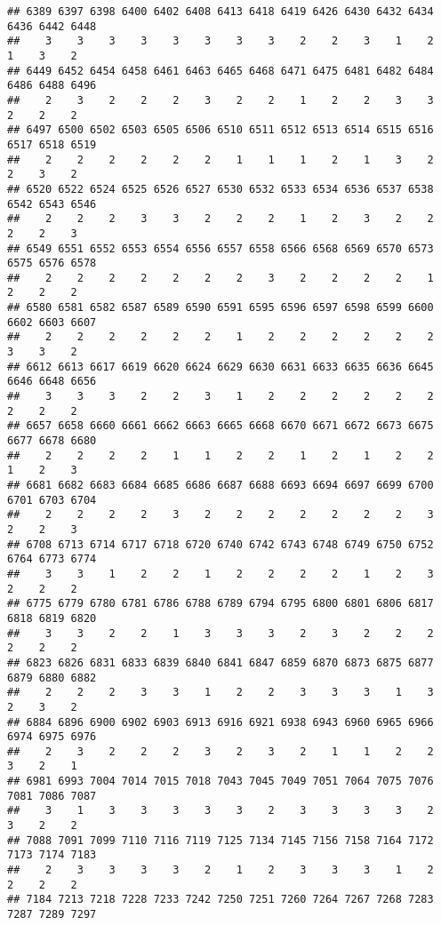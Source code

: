 \documentclass[
]{article}
\begin{document}
\begin{verbatim}
## 6389 6397 6398 6400 6402 6408 6413 6418 6419 6426 6430 6432 6434 6436 6442 6448 
##    3    3    3    3    3    3    3    3    2    2    3    1    2    1    3    2 
## 6449 6452 6454 6458 6461 6463 6465 6468 6471 6475 6481 6482 6484 6486 6488 6496 
##    2    3    2    2    2    3    2    2    1    2    2    3    3    2    2    2 
## 6497 6500 6502 6503 6505 6506 6510 6511 6512 6513 6514 6515 6516 6517 6518 6519 
##    2    2    2    2    2    2    1    1    1    2    1    3    2    2    3    2 
## 6520 6522 6524 6525 6526 6527 6530 6532 6533 6534 6536 6537 6538 6542 6543 6546 
##    2    2    2    3    3    2    2    2    1    2    3    2    2    2    2    3 
## 6549 6551 6552 6553 6554 6556 6557 6558 6566 6568 6569 6570 6573 6575 6576 6578 
##    2    2    2    2    2    2    2    3    2    2    2    2    1    2    2    2 
## 6580 6581 6582 6587 6589 6590 6591 6595 6596 6597 6598 6599 6600 6602 6603 6607 
##    2    2    2    2    2    2    1    2    2    2    2    2    2    3    3    2 
## 6612 6613 6617 6619 6620 6624 6629 6630 6631 6633 6635 6636 6645 6646 6648 6656 
##    3    3    3    2    2    3    1    2    2    2    2    2    2    2    2    2 
## 6657 6658 6660 6661 6662 6663 6665 6668 6670 6671 6672 6673 6675 6677 6678 6680 
##    2    2    2    2    1    1    2    2    1    2    1    2    2    1    2    3 
## 6681 6682 6683 6684 6685 6686 6687 6688 6693 6694 6697 6699 6700 6701 6703 6704 
##    2    2    2    2    3    2    2    2    2    2    2    2    3    2    2    3 
## 6708 6713 6714 6717 6718 6720 6740 6742 6743 6748 6749 6750 6752 6764 6773 6774 
##    3    3    1    2    2    1    2    2    2    2    1    2    3    2    2    2 
## 6775 6779 6780 6781 6786 6788 6789 6794 6795 6800 6801 6806 6817 6818 6819 6820 
##    3    3    2    2    1    3    3    3    2    3    2    2    2    2    2    2 
## 6823 6826 6831 6833 6839 6840 6841 6847 6859 6870 6873 6875 6877 6879 6880 6882 
##    2    2    2    3    3    1    2    2    3    3    3    1    3    2    3    2 
## 6884 6896 6900 6902 6903 6913 6916 6921 6938 6943 6960 6965 6966 6974 6975 6976 
##    2    3    2    2    2    3    2    3    2    1    1    2    2    3    2    1 
## 6981 6993 7004 7014 7015 7018 7043 7045 7049 7051 7064 7075 7076 7081 7086 7087 
##    3    1    3    3    3    3    3    2    3    3    3    3    2    3    2    2 
## 7088 7091 7099 7110 7116 7119 7125 7134 7145 7156 7158 7164 7172 7173 7174 7183 
##    2    3    3    3    3    2    1    2    3    3    3    1    2    2    2    2 
## 7184 7213 7218 7228 7233 7242 7250 7251 7260 7264 7267 7268 7283 7287 7289 7297 

\end{verbatim}
\end{document}
